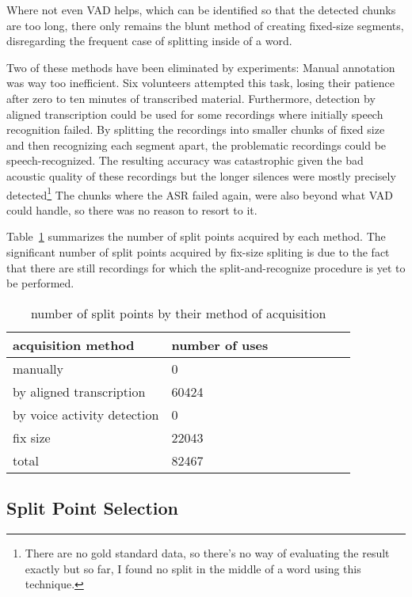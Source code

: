 \documentclass[runningheads]{llncs}
\begin{document}
Where not even VAD helps, which can be identified so that the detected chunks
are too long, there only remains the blunt method of creating fixed-size
segments, disregarding the frequent case of splitting inside of a word.

Two of these methods have been eliminated by experiments: Manual annotation was
way too inefficient. Six volunteers attempted this task, losing their patience
after zero to ten minutes of transcribed material. Furthermore, detection by aligned
transcription could be used for some recordings where initially speech
recognition failed. By splitting the recordings into smaller chunks of fixed
size and then
recognizing each segment apart, the problematic recordings could be
speech-recognized. The resulting accuracy was catastrophic given the bad
acoustic quality of these recordings but the
longer silences were mostly precisely detected\footnote{There are no gold
standard data, so there's no way of evaluating the result exactly but so far, I
found no split in the middle of a word using this technique.} The chunks where
the ASR failed again, were also beyond what VAD could handle, so there was no reason
to resort to it.

Table~\ref{tab:splitpoints} summarizes the number of split points acquired by
each method. The significant number of split points acquired by fix-size
spliting is due to the fact that there are still recordings for which the
split-and-recognize procedure is yet to be performed.

\begin{table}[htpb]
\begin{center}
\begin{tabular}{|l|l|l|l||l|l|l|l|}
\hline
acquisition method & number of uses \\
\hline
manually & 0 \\
by aligned transcription & 60424 \\
by voice activity detection & 0 \\
fix size & 22043 \\
total & 82467 \\
\hline
\end{tabular}
\caption{number of split points by their method of
acquisition}\label{tab:splitpoints}
\end{center}
\end{table}

\subsection{Split Point Selection}
\end{document}
